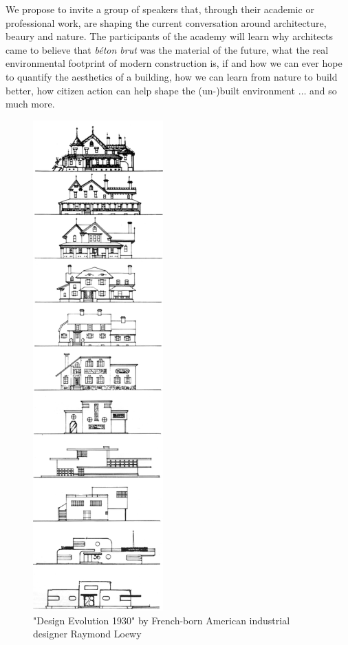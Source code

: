 \documentclass{article}
\begin{document}
\begin{minipage}{0.625\textwidth}
We propose to invite a group of speakers that, through their academic or professional work, are shaping the current conversation around architecture, beaury and nature. The participants of the academy will learn why architects came to believe that \textit{béton brut} was the material of the future, what the real environmental footprint of modern construction is, if and how we can ever hope to quantify the aesthetics of a building, how we can learn from nature to build better, how citizen action can help shape the (un-)built environment $\dots$ and so much more.

\end{minipage}\hspace{15mm}
\begin{minipage}{0.325\textwidth}
    \begin{figure}[H]
    \includegraphics[width=50mm]{./figures/loewy_architecture.png}
    \caption{
        "Design Evolution 1930" by French-born American industrial designer Raymond Loewy \cite{loewy_industrial_1979}
    }
    \label{fig:loewy}
    \end{figure}
\end{minipage}
\end{document}
